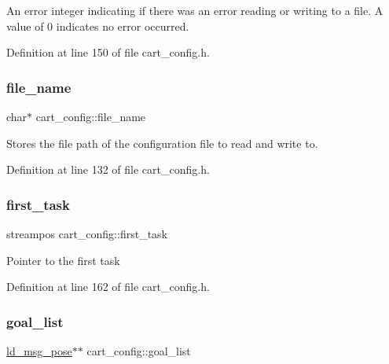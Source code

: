 An error integer indicating if there was an error reading or writing to a file. A value of 0 indicates no error occurred. 

Definition at line 150 of file cart\+\_\+config.\+h.

\mbox{\label{classcart__config_a3de41943f6230959d80159eb591cc9ef}} 
\subsubsection{\texorpdfstring{file\+\_\+name}{file\_name}}
{\footnotesize\ttfamily char$\ast$ cart\+\_\+config\+::file\+\_\+name\hspace{0.3cm}{\ttfamily [private]}}

Stores the file path of the configuration file to read and write to. 

Definition at line 132 of file cart\+\_\+config.\+h.

\mbox{\label{classcart__config_af683646edbe7260d8b12bc4fe4f885db}} 
\subsubsection{\texorpdfstring{first\+\_\+task}{first\_task}}
{\footnotesize\ttfamily streampos cart\+\_\+config\+::first\+\_\+task\hspace{0.3cm}{\ttfamily [private]}}

Pointer to the first task 

Definition at line 162 of file cart\+\_\+config.\+h.

\mbox{\label{classcart__config_ac484fbaf3da5c3fcbf6b0b338ebf7812}} 
\subsubsection{\texorpdfstring{goal\+\_\+list}{goal\_list}}
{\footnotesize\ttfamily \mbox{\hyperlink{structld__msg__pose}{ld\+\_\+msg\+\_\+pose}}$\ast$$\ast$ cart\+\_\+config\+::goal\+\_\+list\hspace{0.3cm}{\ttfamily [private]}}

